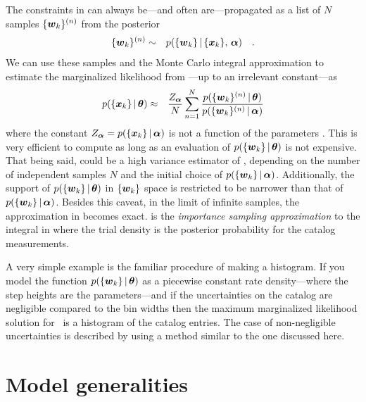The constraints in  can always be---and often are---propagated
as a list of $N$ samples $\{{{\boldsymbol{w}}}_k\}^{(n)}$ from the posterior
\begin{eqnarray}\eqlabel{samples}
\{\entry_k\}^{(n)} &\sim& p(\{\entry_k\}\,|\,\{\data_k\},\,\interim) \quad.
\end{eqnarray}
We can use these samples and the Monte Carlo integral approximation to
estimate the marginalized likelihood from ---up to an
irrelevant constant---as
\begin{eqnarray}\eqlabel{importance}
p(\{\data_k\}\,|\,\ratepars) &\approx&
    \frac{Z_\interim}{N} \sum_{n=1}^N
    \frac{p(\{\entry_k\}^{(n)}\,|\,\ratepars)}
         {p(\{\entry_k\}^{(n)}\,|\,\interim)}
\end{eqnarray}
where the constant $Z_{{\boldsymbol{\alpha}}} = p(\{{{\boldsymbol{x}}}_k\}\,|\,{{\boldsymbol{\alpha}}})$ is not a
function of the parameters \ratepars.
This is very efficient to compute as long as an evaluation of
$p(\{{{\boldsymbol{w}}}_k\}\,|\,{{\boldsymbol{{\theta}}}})$ is not expensive.
That being said,  could be a high variance estimator of
, depending on the number of independent samples $N$ and
the initial choice of $p(\{{{\boldsymbol{w}}}_k\}\,|\,{{\boldsymbol{\alpha}}})$.
Additionally, the support of $p(\{{{\boldsymbol{w}}}_k\}\,|\,{{\boldsymbol{{\theta}}}})$ in $\{{{\boldsymbol{w}}}_k\}$
space is restricted to be narrower than that of
$p(\{{{\boldsymbol{w}}}_k\}\,|\,{{\boldsymbol{\alpha}}})$.
Besides this caveat, in the limit of infinite samples, the approximation in
 becomes exact.
 is the \emph{importance sampling approximation} to the
integral in  where the trial density is the posterior
probability for the catalog measurements.

A very simple example is the familiar procedure of making a histogram.
If you model the function $p(\{{{\boldsymbol{w}}}_k\}\,|\,{{\boldsymbol{{\theta}}}})$ as a piecewise
constant rate density---where the step heights are the parameters---and if the
uncertainties on the catalog are negligible compared to the bin widths then
the maximum marginalized likelihood solution for \ratepars\ is a histogram of
the catalog entries.
The case of non-negligible uncertainties is described by \citet{Hogg:2010a}
using a method similar to the one discussed here.

\section{Model generalities}


